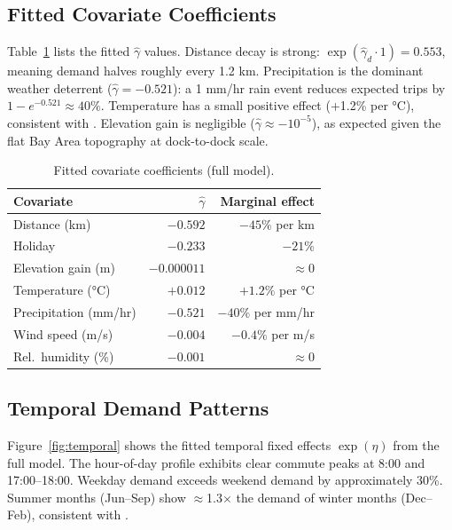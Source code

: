 \documentclass[conference,10pt]{IEEEtran}
\begin{document}
\subsection{Fitted Covariate Coefficients}

Table~\ref{tab:coef} lists the fitted $\hat\gamma$ values.
Distance decay is strong: $\exp(\hat\gamma_d\cdot 1) = 0.553$,
meaning demand halves roughly every 1.2 km.
Precipitation is the dominant weather deterrent
($\hat\gamma = -0.521$): a 1 mm/hr rain event reduces expected trips
by $1-e^{-0.521}\approx40\%$.  Temperature has a small positive
effect (+1.2\% per °C), consistent with \citet{Gebhart2014}.
Elevation gain is negligible ($\hat\gamma\approx-10^{-5}$), as
expected given the flat Bay Area topography at dock-to-dock scale.

\begin{table}[t]
  \caption{Fitted covariate coefficients (full model).}
  \label{tab:coef}
  \centering
  \small
  \begin{tabular}{lrr}
    \toprule
    Covariate & $\hat\gamma$ & Marginal effect\\
    \midrule
    Distance (km)        & $-0.592$ & $-45\%$ per km\\
    Holiday              & $-0.233$ & $-21\%$\\
    Elevation gain (m)   & $-0.000011$ & $\approx 0$\\
    Temperature (°C)     & $+0.012$  & $+1.2\%$ per °C\\
    Precipitation (mm/hr)& $-0.521$  & $-40\%$ per mm/hr\\
    Wind speed (m/s)     & $-0.004$  & $-0.4\%$ per m/s\\
    Rel.\ humidity (\%)  & $-0.001$  & $\approx 0$\\
    \bottomrule
  \end{tabular}
\end{table}

\subsection{Temporal Demand Patterns}

Figure~\ref{fig:temporal} shows the fitted temporal fixed effects
$\exp(\eta)$ from the full model.  The hour-of-day profile exhibits
clear commute peaks at 8:00 and 17:00--18:00.  Weekday demand exceeds
weekend demand by approximately 30\%.  Summer months (Jun--Sep) show
$\approx$1.3$\times$ the demand of winter months (Dec--Feb), consistent
with \citet{Gebhart2014}.
\end{document}
